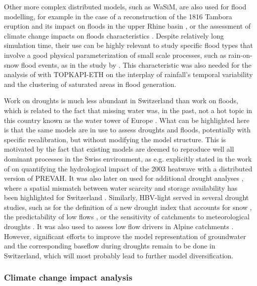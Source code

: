 \documentclass[10pt,a4paper]{article}
\begin{document}
Other more complex distributed models, such as WaSiM, are also used for flood modelling, for example in the case of a reconstruction of the 1816 Tambora eruption and its impact on floods in the upper Rhine basin \citep[see Fig. \ref{fig:map};][]{Rossler2018}, or the assessment of climate change impacts on floods characteristics \citep{Keller2019a}. Despite relatively long simulation time, their use can be highly relevant to study specific flood types that involve a good physical parameterization of small scale processes, such as rain-on-snow flood events, as in the study by \citet{Rossler2014}. This characteristic was also needed for the analysis of \citet{Paschalis2014} with TOPKAPI-ETH on the interplay of rainfall's temporal variability and the clustering of saturated areas in flood generation.

Work on droughts is much less abundant in Switzerland than work on floods, which is related to the fact that missing water was, in the past, not a hot topic in this country known as the water tower of Europe \citep{Milano2015}. What can be highlighted here is that the same models are in use to assess droughts and floods, potentially with specific recalibration, but without modifying the model structure. This is motivated by the fact that existing models are deemed to reproduce well all dominant processes in the Swiss environment, as e.g. explicitly stated in the work of \citet{Zappa2007a} on quantifying the hydrological impact of the 2003 heatwave with a distributed version of PREVAH. It was also later on used for additional drought analyses \citep{Brunner2019e, Zappa2019}, where a spatial mismatch between water scarcity and storage availability has been highlighted for Switzerland \citep{Brunner2019e}. Similarly, HBV-light served in several drought studies, such as for the definition of a new drought index that accounts for snow \citep{Staudinger2014}, the predictability of low flows \citep{Staudinger2014a}, or the sensitivity of catchments to meteorological droughts \citep{Staudinger2015}. It was also used to assess low flow drivers in Alpine catchments \citep{Arnoux2020}. However, significant efforts to improve the model representation of groundwater and the corresponding baseflow during droughts remain to be done in Switzerland, which will most probably lead to further model diversification.


\subsubsection{Climate change impact analysis}
\label{sec:application:climatechange}
\end{document}
